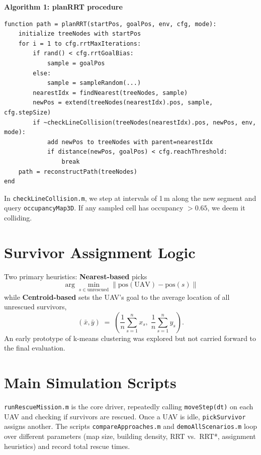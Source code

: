 \documentclass[12pt,a4paper]{report}
\begin{document}
\noindent
\textbf{Algorithm 1: planRRT procedure}
\begin{verbatim}
function path = planRRT(startPos, goalPos, env, cfg, mode):
    initialize treeNodes with startPos
    for i = 1 to cfg.rrtMaxIterations:
        if rand() < cfg.rrtGoalBias:
            sample = goalPos
        else:
            sample = sampleRandom(...)
        nearestIdx = findNearest(treeNodes, sample)
        newPos = extend(treeNodes(nearestIdx).pos, sample, cfg.stepSize)
        if ~checkLineCollision(treeNodes(nearestIdx).pos, newPos, env, mode):
            add newPos to treeNodes with parent=nearestIdx
            if distance(newPos, goalPos) < cfg.reachThreshold:
                break
    path = reconstructPath(treeNodes)
end
\end{verbatim}

In \texttt{checkLineCollision.m}, we step at intervals of 1\,m along the new segment 
and query \texttt{occupancyMap3D}. If any sampled cell has occupancy $> 0.65$, 
we deem it colliding.

\section{Survivor Assignment Logic}
\label{sec:assignment_logic}
Two primary heuristics: \textbf{Nearest-based} picks 
\[
  \arg\min_{s \in \mathrm{unrescued}} \| \mathrm{pos}(\mathrm{UAV}) - \mathrm{pos}(s) \|
\]
while \textbf{Centroid-based} sets the UAV’s goal to the average location of all unrescued 
survivors,
\[
  (\bar{x}, \bar{y}) \;=\; \left(\frac{1}{n} \sum_{s=1}^n x_s,\; \frac{1}{n} \sum_{s=1}^n y_s \right).
\]
An early prototype of k-means clustering was explored but not carried forward to the final evaluation.


\section{Main Simulation Scripts}
\label{sec:simulation_scripts}
\texttt{runRescueMission.m} is the core driver, repeatedly calling \texttt{moveStep(dt)} 
on each UAV and checking if survivors are rescued. Once a UAV is idle, \texttt{pickSurvivor} 
assigns another. The scripts \texttt{compareApproaches.m} and \texttt{demoAllScenarios.m} 
loop over different parameters (map size, building density, RRT vs.\ RRT*, assignment 
heuristics) and record total rescue times.

\end{document}
